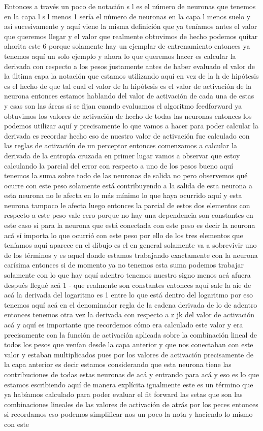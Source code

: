 Entonces a través un poco de notación s l es el número de neuronas que tenemos en la capa l s l menos 1 sería el número de neuronas en la capa l menos suelo y así sucesivamente y aquí viene la misma definición que ya teníamos antes el valor que queremos llegar y el valor que realmente obtuvimos de hecho podemos quitar ahorita este 6 porque solamente hay un ejemplar de entrenamiento entonces ya tenemos aquí un solo ejemplo y ahora lo que queremos hacer es calcular la derivada con respecto a los pesos justamente antes de haber evaluado el valor de la última capa la notación que estamos utilizando aquí en vez de la h de hipótesis es el hecho de que tal cual el valor de la hipótesis es el valor de activación de la neurona entonces estamos hablando del valor de activación de cada una de estas y esas son las áreas si se fijan cuando evaluamos el algoritmo feedforward ya obtuvimos los valores de activación de hecho de todas las neuronas entonces los podemos utilizar aquí y precisamente lo que vamos a hacer para poder calcular la derivada es recordar hecho eso de nuestro valor de activación fue calculado con las reglas de activación de un perceptor entonces comenzamos a calcular la derivada de la entropía cruzada en primer lugar vamos a observar que estoy calculando la parcial del error con respecto a uno de los pesos bueno aquí tenemos la suma sobre todo de las neuronas de salida no pero observemos qué ocurre con este peso solamente está contribuyendo a la salida de esta neurona a esta neurona no le afecta en lo más mínimo lo que haya ocurrido aquí y esta neurona tampoco le afecta luego entonces la parcial de estos dos elementos con respecto a este peso vale cero porque no hay una dependencia son constantes en este caso si para la neurona que está conectada con este peso es decir la neurona acá sí importa lo que ocurrió con este peso por ello de los tres elementos que teníamos aquí aparece en el dibujo es el en general solamente va a sobrevivir uno de los términos y es aquel donde estamos trabajando exactamente con la neurona carísima entonces si de momento ya no tenemos esta suma podemos trabajar solamente con lo que hay aquí adentro tenemos nuestro signo menos acá afuera después llegué acá 1 - que realmente son constantes entonces aquí sale la aie de acá la derivada del logaritmo es 1 entre lo que está dentro del logaritmo por eso tenemos aquí acá en el denominador regla de la cadena derivada de lo de adentro entonces tenemos otra vez la derivada con respecto a z jk del valor de activación acá y aquí es importante que recordemos cómo era calculado este valor y era precisamente con la función de activación aplicada sobre la combinación lineal de todos los pesos que venían desde la capa anterior y que nos conectaban con este valor y estaban multiplicados pues por los valores de activación precisamente de la capa anterior es decir estamos considerando que esta neurona tiene las contribuciones de todas estas neuronas de acá y entrando para acá y eso es lo que estamos escribiendo aquí de manera explícita igualmente este es un término que ya habíamos calculado para poder evaluar el fit forward las setas que son las combinaciones lineales de las valores de activación de atrás por los peces entonces si recordamos eso podemos simplificar nos un poco la nota y haciendo lo mismo con este 